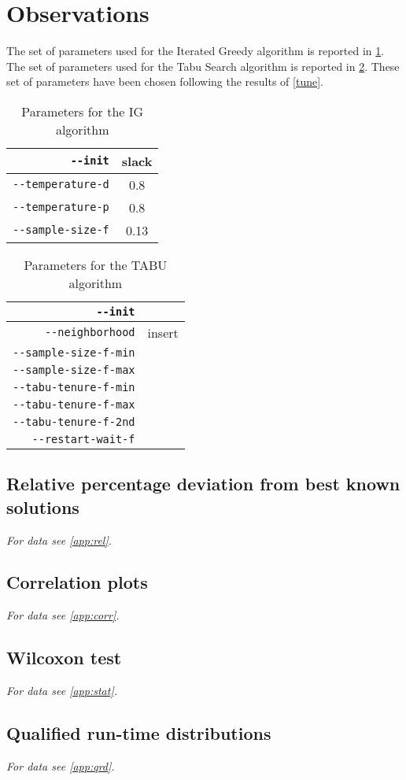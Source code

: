 \section{Observations}

The set of parameters used for the Iterated Greedy algorithm is reported in \ref{obs:table/ig-tune}. 
The set of parameters used for the Tabu Search algorithm is reported in \ref{obs:table/tabu-tune}. These set of parameters have been chosen following the results of \ref{tune}.


\begin{table}[H]
\begin{center}
\caption{Parameters for the IG algorithm}
\label{obs:table/ig-tune}
\begin{tabular}{|r|c|}
\hline
\verb!--init! & slack\\
\hline
\hline
\verb!--temperature-d! & 0.8\\
\hline
\verb!--temperature-p! & 0.8\\
\hline
\hline
\verb!--sample-size-f! & 0.13\\
\hline
\end{tabular}
\end{center}
\end{table}


\begin{table}[H]
\begin{center}
\caption{Parameters for the TABU algorithm}
\label{obs:table/tabu-tune}
\begin{tabular}{|r|c|}
\hline
\verb!--init! & \\
\hline
\verb!--neighborhood! & insert\\
\hline
\hline
\verb!--sample-size-f-min! & \\
\hline
\verb!--sample-size-f-max! & \\
\hline
\hline
\verb!--tabu-tenure-f-min! & \\
\hline
\verb!--tabu-tenure-f-max! & \\
\hline
\verb!--tabu-tenure-f-2nd! & \\
\hline
\hline
\verb!--restart-wait-f! & \\
\hline
\end{tabular}
\end{center}
\end{table}



\subsection{Relative percentage deviation from best known solutions}

\emph{For data see \ref{app:rel}.}

\subsection{Correlation plots}

\emph{For data see \ref{app:corr}.}

\subsection{Wilcoxon test}

\emph{For data see \ref{app:stat}.}

\subsection{Qualified run-time distributions}

\emph{For data see \ref{app:qrd}.}